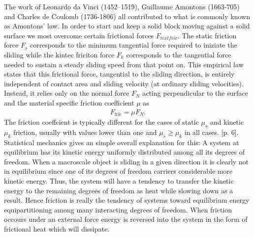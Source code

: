 The work of Leonardo da Vinci (1452–1519), Guillaume Amontons (1663-705) and Charles de Coulomb (1736-1806) all contributed to what is
 commonly known as Amontons’ law. In order to start and keep a solid block moving against a solid surface we most overcome certain frictional forces $F_{text{fric}}$. The static friction force $F_s$ corresponds to the minimum tangential force required to iniziate the sliding while the kintec friciton force $F_k$ corresponds to the tangential force needed to sustain a steady sliding speed from that point on. This empirical law states that this frictional force, tangential to the sliding direction, is entirely independent of contact area and sliding velocity (at ordinary sliding velocities). Instead, it relies only on the normal force $F_N$ acting perpendicular to the surface and the material specific friction coefficient $\mu$ as
\begin{align*}
  F_{\text{fric}} = \mu F_N.
\end{align*}
The friction coeffcient is typically different for the cases of static $\mu_s$ and kinetic $\mu_k$ friction, usually with values
lower than one and $\mu_s \ge \mu_k$ in all cases. \cite{gnecco_meyer_2015}[p. 6]. \\


Statistical mechanics gives an simple overall explanation for this: A system at equilibrium has its kinetic energy uniformly distributed among all its degrees of freedom. When a macroscale object is sliding in a given direction it is clearly not in equilibrium since one of its degrees of freedom carriers considerable more kinetic energy. Thus, the system will have a tendency to transfer the kinetic energy to the remaining degrees of freedom as heat while slowing down as a result. Hence friction is really the tendency of systems toward equilibrium energy equipartitioning among many interacting degrees of freedom. When friction occours under an external force energy is reversed into the system in the form of frictional heat which will dissipate. \cite{Manini_2016}


